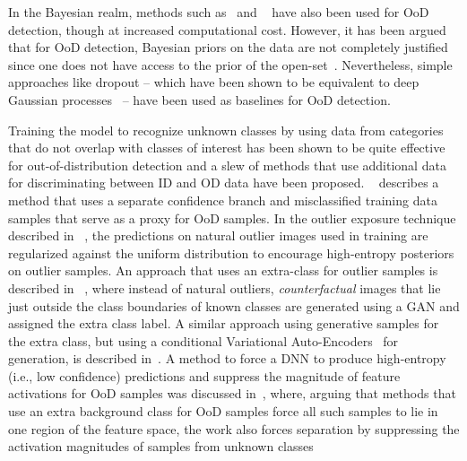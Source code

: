 \documentclass[accepted]{uai2021} \pdfoutput=1
\begin{document}
In the Bayesian realm, methods such as~\cite{maddox2019simple} and ~\cite{osawa2019practical} have also been used for OoD detection, though at increased computational cost.  However, it has been argued that for OoD detection,  Bayesian priors on the data are not completely justified since one does not have access to the prior of the open-set~\cite{boult2019learning}. Nevertheless, simple approaches like dropout -- which have been shown to be equivalent to deep Gaussian processes~\cite{gal2016dropout} -- have been used as baselines for OoD detection.

Training the model to recognize unknown classes by using data from categories that do not overlap with classes of interest has been shown to be quite effective for out-of-distribution detection and a  slew of methods that use additional data for discriminating between ID and OD data have been proposed.
~\cite{devries2018learning} describes a method that uses
 a separate confidence branch
and misclassified  training data samples that serve as a proxy for OoD samples.
In the outlier exposure technique described in ~\cite{hendrycks2018deep}, the predictions on natural outlier images used in training are regularized against the uniform distribution to encourage high-entropy posteriors on outlier samples.
An approach that uses an extra-class for outlier samples is described in ~\cite{neal2018open}, where instead of natural outliers, \textit{counterfactual} images that lie just outside the class boundaries of known classes are generated using a GAN and assigned the extra class label. A similar approach using generative samples for the extra class, but using a conditional Variational Auto-Encoders~\cite{kingma2013auto} for generation, is described in~\cite{vernekar2019out}. A method to force a DNN to produce high-entropy (i.e., low confidence)  predictions and suppress the magnitude of feature activations for OoD samples was discussed in~\cite{dhamija2018reducing}, where, arguing that methods that use an extra background class for OoD samples force all such samples to lie in one region of the feature space,  the work also  forces separation by suppressing the activation magnitudes of samples from unknown classes 
\end{document}
